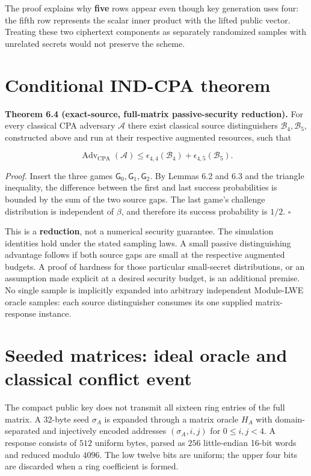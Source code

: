 \documentclass[
  11pt,
  a4paper,
  oneside]{report}
\begin{document}
The proof explains why \textbf{five} rows appear even though key
generation uses four: the fifth row represents the scalar inner product
with the lifted public vector. Treating these two ciphertext components
as separately randomized samples with unrelated secrets would not
preserve the scheme.

\section{Conditional IND-CPA theorem}\label{conditional-ind-cpa-theorem}

\textbf{Theorem 6.4 (exact-source, full-matrix passive-security
reduction).} For every classical CPA adversary \(\mathcal A\) there
exist classical source distinguishers \(\mathcal B_4,\mathcal B_5\),
constructed above and run at their respective augmented resources, such
that

\[
\boxed{
\operatorname{Adv}_{\mathrm{CPA}}(\mathcal A)
\le \epsilon_{4,4}(\mathcal B_4)+\epsilon_{4,5}(\mathcal B_5).}
\]

\emph{Proof.} Insert the three games
\(\mathsf G_0,\mathsf G_1,\mathsf G_2\). By Lemmas 6.2 and 6.3 and the
triangle inequality, the difference between the first and last success
probabilities is bounded by the sum of the two source gaps. The last
game's challenge distribution is independent of \(\beta\), and therefore
its success probability is \(1/2\). \(\square\)

This is a \textbf{reduction}, not a numerical security guarantee. The
simulation identities hold under the stated sampling laws. A small
passive distinguishing advantage follows if both source gaps are small
at the respective augmented budgets. A proof of hardness for those
particular small-secret distributions, or an assumption made explicit at
a desired security budget, is an additional premise. No single sample is
implicitly expanded into arbitrary independent Module-LWE oracle
samples: each source distinguisher consumes its one supplied
matrix-response instance.

\section{Seeded matrices: ideal oracle and classical conflict
event}\label{seeded-matrices-ideal-oracle-and-classical-conflict-event}

The compact public key does not transmit all sixteen ring entries of the
full matrix. A 32-byte seed \(\sigma_A\) is expanded through a matrix
oracle \(H_A\) with domain-separated and injectively encoded addresses
\((\sigma_A,i,j)\) for \(0\le i,j<4\). A response consists of \(512\)
uniform bytes, parsed as \(256\) little-endian 16-bit words and reduced
modulo \(4096\). The low twelve bits are uniform; the upper four bits
are discarded when a ring coefficient is formed.
\end{document}
